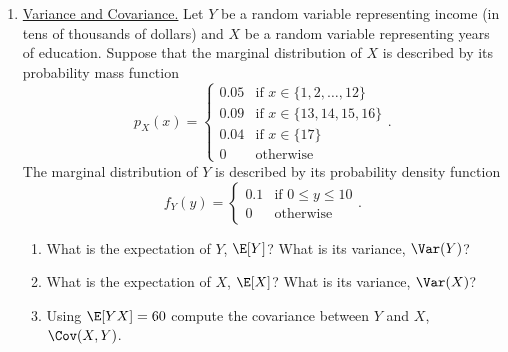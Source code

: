 \documentclass[10pt]{article}
\begin{document}
\begin{enumerate}
\begin{enumerate}
		 
	\end{enumerate}
	\item \underline{Variance and Covariance.} Let \(Y\) be a random variable representing income (in tens of thousands of dollars) and \(X\) be a random variable representing years of education. Suppose that the marginal distribution of \(X\) is described by its probability mass function
	\[
		p_X(x) = \begin{cases}
			0.05 & \text{if }x\in \{1,2,\dots,12\}  \\
			0.09 &\text{if }x \in \{13,14,15,16\}  \\
			0.04 &\text{if }x \in \{17\} \\
			0 &\text{otherwise }
		\end{cases}
	.\]
	The marginal distribution of \(Y\) is described by its probability density function
	\[
		f_Y(y) = \begin{cases}
			0.1	 & \text{if } 0\leq y\leq 10 \\
			0 &\text{otherwise }
		\end{cases}
	.\]	
	\begin{enumerate}
		\item What is the expectation of \(Y\),  \(\E[Y]\)? What is its variance,  \(\Var(Y)\)?
		
		 
		\item What is the expectation of \(X\),  \(\E[X]\)? What is its variance, \(\Var(X)\)?

		 
		\item Using \(\E[YX] = 60\) compute the covariance between  \(Y\) and  \(X\),  \(\Cov(X,Y)\).


\end{enumerate}
\end{enumerate}
\end{document}
